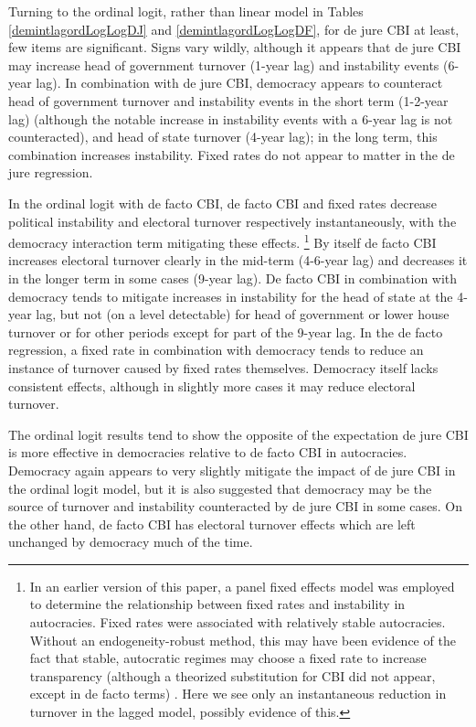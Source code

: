 \documentclass{article}
\begin{document}
    Turning to the ordinal logit, rather than linear model in Tables \ref*{demintlagordLogLogDJ} and \ref*{demintlagordLogLogDF}, for de jure CBI at least, few items are significant. Signs vary wildly, although it appears that de jure CBI may increase head of government turnover (1-year lag) and instability events (6-year lag). In combination with de jure CBI, democracy appears to counteract head of government turnover and instability events in the short term (1-2-year lag) (although the notable increase in instability events with a 6-year lag is not counteracted), and head of state turnover (4-year lag); in the long term, this combination increases instability. Fixed rates do not appear to matter in the de jure regression.

    In the ordinal logit with de facto CBI, de facto CBI and fixed rates decrease political instability and electoral turnover respectively instantaneously, with the democracy interaction term mitigating these effects. \footnote{In an earlier version of this paper, a panel fixed effects model was employed to determine the relationship between fixed rates and instability in autocracies. Fixed rates were associated with relatively stable autocracies. Without an endogeneity-robust method, this may have been evidence of the fact that stable, autocratic regimes may choose a fixed rate to increase transparency (although a theorized substitution for CBI did not appear, except in de facto terms) \citep{broz_political_2002}. Here we see only an instantaneous reduction in turnover in the lagged model, possibly evidence of this.} By itself de facto CBI increases electoral turnover clearly in the mid-term (4-6-year lag) and decreases it in the longer term in some cases (9-year lag). De facto CBI in combination with democracy tends to mitigate increases in instability for the head of state at the 4-year lag, but not (on a level detectable) for head of government or lower house turnover or for other periods except for part of the 9-year lag. In the de facto regression, a fixed rate in combination with democracy tends to reduce an instance of turnover caused by fixed rates themselves. Democracy itself lacks consistent effects, although in slightly more cases it may reduce electoral turnover.

    The ordinal logit results tend to show the opposite of the expectation de jure CBI is more effective in democracies relative to de facto CBI in autocracies. Democracy again appears to very slightly mitigate the impact of de jure CBI in the ordinal logit model, but it is also suggested that democracy may be the source of turnover and instability counteracted by de jure CBI in some cases. On the other hand, de facto CBI has electoral turnover effects which are left unchanged by democracy much of the time.
\end{document}
